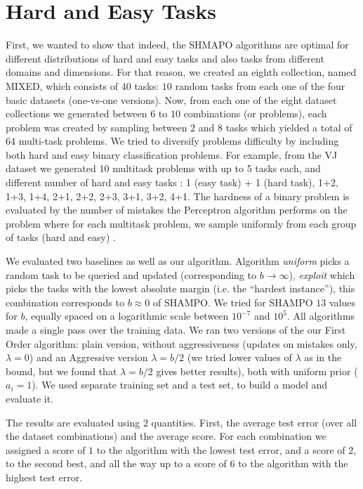 \section{Hard and Easy Tasks }
First, we wanted to show that indeed, the SHMAPO algorithms are optimal for different distributions of hard and
 easy tasks and also tasks from different domains and dimensions. For that reason, we created an eighth 
 collection, named MIXED, which consists of $40$ tasks: $10$ random tasks from each one of the four 
 basic datasets (one-vs-one versions). Now, from each one of the eight dataset collections we generated 
 between $6$ to $10$ combinations (or problems), each problem was created by sampling between 
 $2$ and $8$ tasks which yielded a total of $64$ multi-task problems. 
We tried to diversify problems difficulty by including both hard and easy binary classification problems.
For example, from the VJ dataset we generated 10 multitask problems with up to 5 tasks each, and different 
number of hard and easy tasks : 1 (easy task) + 1 (hard task), 1+2, 1+3, 1+4, 2+1, 2+2, 2+3, 3+1, 3+2, 4+1.
The hardness of a binary problem is evaluated by the number of mistakes the Perceptron algorithm performs 
on the problem where for each multitask problem, we sample uniformly from each group of tasks 
(hard and easy) .

We evaluated two baselines as well as our algorithm. Algorithm {\em uniform} picks a random task to be 
queried and updated (corresponding to $b\rightarrow\infty$), {\em exploit} which picks the tasks with the 
lowest absolute margin (i.e. the ``hardest instance''), this combination corresponds to $b \approx 0$ of 
SHAMPO. We tried for SHAMPO $13$ values for $b$, equally spaced on a logarithmic scale between 
$10^{-7}$ and $10^{5}$. 
All algorithms made a single pass over the training data.  We ran two versions of the our First Order algorithm: 
plain version, without aggressiveness (updates on mistakes only, $\lambda=0$) and an 
Aggressive version $\lambda=b/2$ (we tried lower values of $\lambda$ as in the bound, 
but we found that $\lambda=b/2$ gives better results), both with uniform prior ($a_i=1$). 
We used separate training set and a test set, to build a model and evaluate it.

The results are evaluated using $2$ quantities. First, the average test error (over all the dataset combinations) 
and the average score. For each combination we assigned a score of $1$ to the algorithm with the lowest 
test error, and a score of $2$, to the second best, and all the way up to a score of $6$ to the algorithm with 
the highest test error.



